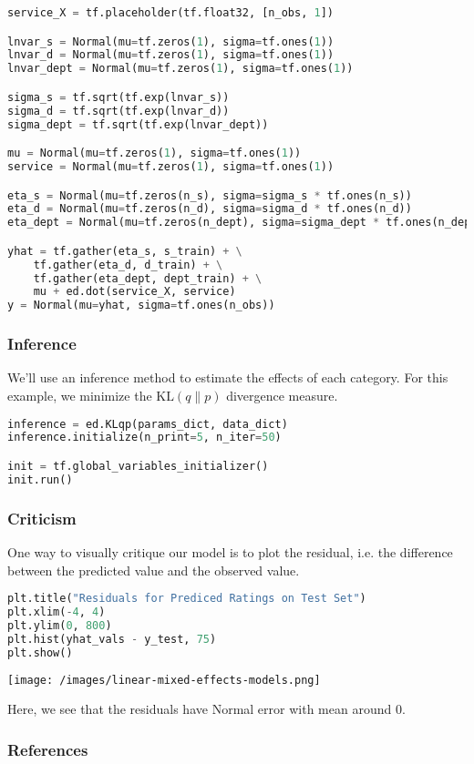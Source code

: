 \begin{lstlisting}[language=Python]
service_X = tf.placeholder(tf.float32, [n_obs, 1])

lnvar_s = Normal(mu=tf.zeros(1), sigma=tf.ones(1))
lnvar_d = Normal(mu=tf.zeros(1), sigma=tf.ones(1))
lnvar_dept = Normal(mu=tf.zeros(1), sigma=tf.ones(1))

sigma_s = tf.sqrt(tf.exp(lnvar_s))
sigma_d = tf.sqrt(tf.exp(lnvar_d))
sigma_dept = tf.sqrt(tf.exp(lnvar_dept))

mu = Normal(mu=tf.zeros(1), sigma=tf.ones(1))
service = Normal(mu=tf.zeros(1), sigma=tf.ones(1))

eta_s = Normal(mu=tf.zeros(n_s), sigma=sigma_s * tf.ones(n_s))
eta_d = Normal(mu=tf.zeros(n_d), sigma=sigma_d * tf.ones(n_d))
eta_dept = Normal(mu=tf.zeros(n_dept), sigma=sigma_dept * tf.ones(n_dept))

yhat = tf.gather(eta_s, s_train) + \
    tf.gather(eta_d, d_train) + \
    tf.gather(eta_dept, dept_train) + \
    mu + ed.dot(service_X, service)
y = Normal(mu=yhat, sigma=tf.ones(n_obs))
\end{lstlisting}

\subsubsection{Inference}

We'll use an inference method to estimate the effects of each category. For this example, we minimize the $\text{KL}(q\|p)$ divergence measure.

\begin{lstlisting}[language=Python]
inference = ed.KLqp(params_dict, data_dict)
inference.initialize(n_print=5, n_iter=50)

init = tf.global_variables_initializer()
init.run()
\end{lstlisting}

\subsubsection{Criticism}

One way to visually critique our model is to plot the residual, i.e. the difference between the predicted value and the observed value.

\begin{lstlisting}[language=Python]
plt.title("Residuals for Prediced Ratings on Test Set")
plt.xlim(-4, 4)
plt.ylim(0, 800)
plt.hist(yhat_vals - y_test, 75)
plt.show()
\end{lstlisting}

\texttt{[image: /images/linear-mixed-effects-models.png]}

Here, we see that the residuals have Normal error with mean around 0.

\subsubsection{References}\label{references}
